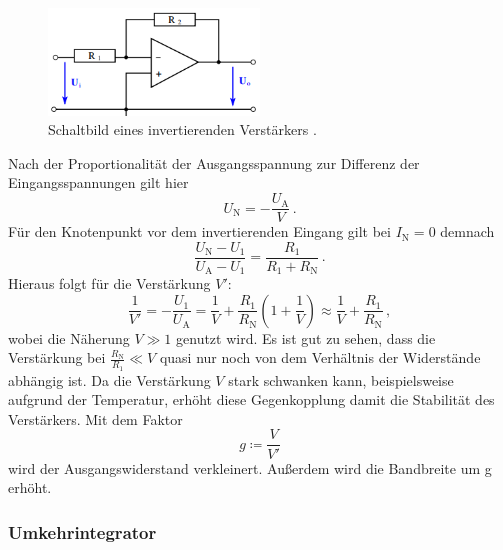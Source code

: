 \begin{figure}
    \centering
    \includegraphics[width=0.5\textwidth]{invertierend.png}
    \caption{Schaltbild eines invertierenden Verstärkers \cite{ap51}.}
    \label{fig:verstaerker}
\end{figure}

\noindent
Nach der Proportionalität der Ausgangsspannung zur Differenz der Eingangsspannungen gilt hier 
\begin{equation}
    U_\text{N} = - \frac{U_\text{A}}{V}\, .
\end{equation}
Für den Knotenpunkt vor dem invertierenden Eingang gilt bei $I_\text{N} = 0$ demnach 
\begin{equation*}
    \frac{U_\text{N} - U_1}{U_\text{A} - U_1} = \frac{R_1}{R_1 + R_\text{N}}\, .
\end{equation*}
Hieraus folgt für die Verstärkung $V'$: 
\begin{equation*}
    \frac{1}{V'} = - \frac{U_1}{U_\text{A}} = \frac{1}{V} + \frac{R_1}{R_\text{N}}\left(1 + \frac{1}{V}\right) \approx \frac{1}{V} + \frac{R_1}{R_\text{N}}\, ,
\end{equation*}
wobei die Näherung $V\gg 1$ genutzt wird. Es ist gut zu sehen, dass die Verstärkung bei $\frac{R_\text{N}}{R_1} \ll V$ quasi nur noch von dem Verhältnis der Widerstände abhängig ist. Da die Verstärkung $V$ stark schwanken kann, beispielsweise aufgrund der Temperatur, erhöht diese Gegenkopplung damit die Stabilität des Verstärkers. Mit dem Faktor 
\begin{equation*}
    g \coloneq \frac{V}{V'}
\end{equation*}
wird der Ausgangswiderstand verkleinert. Außerdem wird die Bandbreite um g erhöht.
 
        



\subsubsection{Umkehrintegrator}

